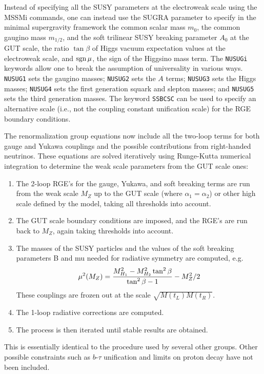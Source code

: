       Instead of specifying all the SUSY parameters at the electroweak
scale using the MSSMi commands, one can instead use the SUGRA parameter
to specify in the minimal supergravity framework the common scalar mass
$m_0$, the common gaugino mass $m_{1/2}$, and the soft trilinear SUSY
breaking parameter $A_0$ at the GUT scale, the ratio $\tan\beta$ of
Higgs vacuum expectation values at the electroweak scale, and $\mathop{\rm sgn}\mu$,
the sign of the Higgsino mass term. The \verb|NUSUGi| keywords allow one
to break the assumption of universality in various ways. \verb|NUSUG1|
sets the gaugino masses; \verb|NUSUG2| sets the $A$ terms; \verb|NUSUG3|
sets the Higgs masses; \verb|NUSUG4| sets the first generation squark
and slepton masses; and \verb|NUSUG5| sets the third generation masses.
The keyword \verb|SSBCSC| can be used to specify an alternative scale
(i.e., not the coupling constant unification scale) for the RGE boundary
conditions.

      The renormalization group equations now include all the two-loop
terms for both gauge and Yukawa couplings and the possible contributions
from right-handed neutrinos. These equations are solved iteratively using
Runge-Kutta numerical integration to determine the weak scale parameters
from the GUT scale ones:
\begin{enumerate}
%
\item The 2-loop RGE's for the gauge, Yukawa, and soft breaking terms
are run from the weak scale $M_Z$ up to the GUT scale (where $\alpha_1 =
\alpha_2$) or other high scale defined by the model, taking all
thresholds into account.
%
\item The GUT scale boundary conditions are imposed, and the RGE's are
run back to $M_Z$, again taking thresholds into account.
%
\item The masses of the SUSY particles and the values of the soft 
breaking parameters B and mu needed for radiative symmetry are
computed, e.g.
$$
\mu^2(M_Z) = {M_{H_1}^2 - M_{H_2}^2  \tan^2\beta \over
\tan^2\beta-1} - M_Z^2/2
$$
These couplings are frozen out at the scale $\sqrt{M(t_L)M(t_R)}$.
%
\item The 1-loop radiative corrections are computed.
%
\item The process is then iterated until stable results are obtained.
\end{enumerate}
This is essentially identical to the procedure used by several other
groups. Other possible constraints such as $b$-$\tau$ unification and 
limits on proton decay have not been included.

